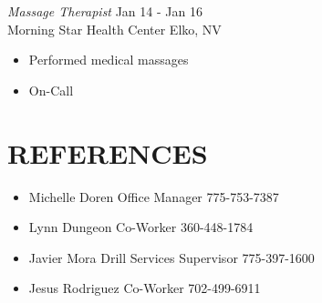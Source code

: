 \documentclass[margin, 10pt]{res} %
\begin{document}
\begin{resume}
    {\sl Massage Therapist} \hfill Jan 14 - Jan 16 \\
    Morning Star Health Center Elko, NV
    \begin{itemize} 
        \item Performed medical massages
        \item On-Call
    \end{itemize} 


    \section{REFERENCES} 
    \begin{itemize} 
        \item Michelle Doren Office Manager 775-753-7387 
        \item Lynn Dungeon Co-Worker 360-448-1784 
        \item Javier Mora Drill Services Supervisor 775-397-1600
        \item Jesus Rodriguez Co-Worker 702-499-6911
    \end{itemize} 


\end{resume}
\end{document}
